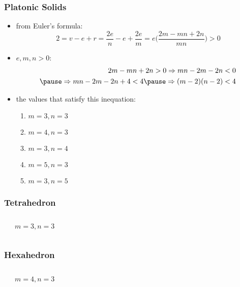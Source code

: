 \documentclass[dvipsnames]{beamer}
\begin{document}
\begin{frame}
  \frametitle{Platonic Solids}

    \begin{itemize}
      \item from Euler's formula:
      \[
        2 = v - e + r = \frac{2e}{n} - e + \frac{2e}{m}
        = e \Big( \frac{2m-mn+2n}{mn} \Big) > 0
      \]

      \pause
      \item $e,m,n > 0$:
      \begin{eqnarray*}
        2m - mn + 2n > 0 \Rightarrow mn - 2m -2n < 0 \\\pause
        \Rightarrow mn - 2m - 2n + 4 < 4 \pause \Rightarrow (m - 2)(n - 2) < 4
      \end{eqnarray*}

      \pause
      \item the values that satisfy this inequation:
      \begin{enumerate}
        \item $m=3, n=3$
        \item $m=4, n=3$
        \item $m=3, n=4$
        \item $m=5, n=3$
        \item $m=3, n=5$
      \end{enumerate}
    \end{itemize}
\end{frame}

\begin{frame}
  \frametitle{Tetrahedron}

  \begin{columns}
    \begin{center}
    \end{center}

    \begin{center}

      $m=3, n=3$
    \end{center}
  \end{columns}
\end{frame}

\begin{frame}
  \frametitle{Hexahedron}

  \begin{columns}
    \begin{center}
    \end{center}

    \begin{center}

      $m=4, n=3$
    \end{center}
  \end{columns}
\end{frame}
\end{document}
